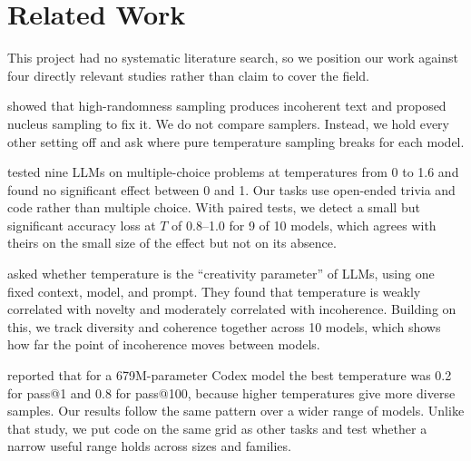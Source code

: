 \section{Related Work}
\label{sec:related}

This project had no systematic literature search, so we position our work against four directly relevant studies rather than claim to cover the field.

\citet{holtzman2020curious} showed that high-randomness sampling produces incoherent text and proposed nucleus sampling to fix it. We do not compare samplers. Instead, we hold every other setting off and ask where pure temperature sampling breaks for each model.

\citet{renze2024temperature} tested nine LLMs on multiple-choice problems at temperatures from 0 to 1.6 and found no significant effect between 0 and 1. Our tasks use open-ended trivia and code rather than multiple choice. With paired tests, we detect a small but significant accuracy loss at $T$ of 0.8--1.0 for 9 of 10 models, which agrees with theirs on the small size of the effect but not on its absence.

\citet{peeperkorn2024temperature} asked whether temperature is the ``creativity parameter'' of LLMs, using one fixed context, model, and prompt. They found that temperature is weakly correlated with novelty and moderately correlated with incoherence. Building on this, we track diversity and coherence together across 10 models, which shows how far the point of incoherence moves between models.

\citet{chen2021codex} reported that for a 679M-parameter Codex model the best temperature was 0.2 for pass@1 and 0.8 for pass@100, because higher temperatures give more diverse samples. Our \passfour results follow the same pattern over a wider range of models. Unlike that study, we put code on the same grid as other tasks and test whether a narrow useful range holds across sizes and families.
